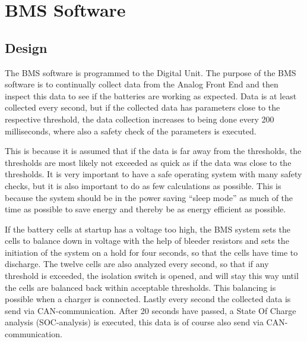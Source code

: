 \section{BMS Software}

\subsection{Design}
The BMS software is programmed to the Digital Unit. The purpose of the BMS software is to continually collect data from the Analog Front End and then inspect this data to see if the batteries are working as expected. Data is at least collected every second, but if the collected data has parameters close to the respective threshold, the data collection increases to being done every 200 milliseconds, where also a safety check of the parameters is executed. 

This is because it is assumed that if the data is far away from the thresholds, the thresholds are most likely not exceeded as quick as if the data was close to the thresholds. It is very important to have a safe operating system with many safety checks, but it is also important to do as few calculations as possible. This is because the system should be in the power saving “sleep mode” as much of the time as possible to save energy and thereby be as energy efficient as possible.

If the battery cells at startup has a voltage too high, the BMS system sets the cells to balance down in voltage with the help of bleeder resistors and sets the initiation of the system on a hold for four seconds, so that the cells have time to discharge. The twelve cells are also analyzed every second, so that if any threshold is exceeded, the isolation switch is opened, and will stay this way until the cells are balanced back within acceptable thresholds. This balancing is possible when a charger is connected. Lastly every second the collected data is send via CAN-communication. After 20 seconds have passed, a State Of Charge analysis (SOC-analysis) is executed, this data is of course also send via CAN-communication.

